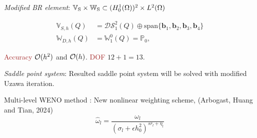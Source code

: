\documentclass[11pt,landscape,usenames,dvipsnames,letterpaper,leqno]{article}
\def\Maroon{\textcolor{mymaroon}}
\def\BurntOrange{\textcolor{BurntOrange}}
\def\Brown{\textcolor{Brown}}
\def\PineGreen{\textcolor{PineGreen}}
\def\OliveGreen{\textcolor{myolivegreen}}
\def\cO{{\cal O}}
\begin{document}
{{{\it\BurntOrange{Modified BR element}}: $\mathbb{V}_{\text{\rm S}} \times \mathbb{W}_{\text{\rm S}} \subset (H_0^1(\Omega))^2\times L^2(\Omega)$

\begin{minipage}{0.26\textwidth}
\begin{equation*}
\begin{aligned}
		  \mathbb{V}_{S,h}(Q) &= \mathcal{DS}_1^2(Q)\oplus \text{span}\{\mathbf{b}_1, \mathbf{b}_2,\mathbf{b}_3, \mathbf{b}_4\}\\
		  \mathbb{W}_{D,h}(Q) &= \mathbb{W}_1^0(Q) = \mathbb{P}_0,
    \end{aligned}
\end{equation*}
\end{minipage}
\begin{minipage}{0.05\textwidth}
\end{minipage}
\Brown{Accuracy} $\cO(h^2)$ and $\cO(h)$.
\Brown{DOF} $12 + 1 = 13$.
\vspace{0.2cm}

{\it\BurntOrange{Saddle point system}}: Resulted saddle 
point system will be solved with modified 
Uzawa iteration.

\vspace{0.3cm}

\Maroon{Multi-level WENO method} : 
New nonlinear weighting scheme,
\OliveGreen{(Arbogast, Huang and Tian, 2024)}
\begin{equation*}         
\hat{\omega}_l = \frac{\omega_l}{(\sigma_l + \epsilon h^2_0)^{sr_l + \eta_l}} 
\end{equation*}                             

}}
\end{document}
